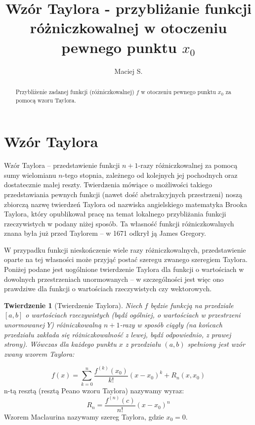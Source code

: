 \documentclass[]{article}
\title{Wzór Taylora - przybliżanie funkcji różniczkowalnej w otoczeniu pewnego punktu $x_0$}
\author{Maciej S.}
\newtheorem{theorem}{Twierdzenie}
\begin{document}
\maketitle

\begin{abstract}
Przybliżenie zadanej funkcji (różniczkowalnej) $f$ w otoczeniu pewnego punktu $x_0$ za pomocą wzoru Taylora.
\end{abstract}

\section{Wzór Taylora}
Wzór Taylora – przedstawienie funkcji $n+1$-razy różniczkowalnej za pomocą sumy wielomianu $n$-tego stopnia, zależnego od kolejnych jej pochodnych oraz dostatecznie małej reszty. Twierdzenia mówiące o możliwości takiego przedstawiania pewnych funkcji (nawet dość abstrakcyjnych przestrzeni) noszą zbiorczą nazwę twierdzeń Taylora od nazwiska angielskiego matematyka Brooka Taylora, który opublikował pracę na temat lokalnego przybliżania funkcji rzeczywistych w podany niżej sposób. Ta własność funkcji różniczkowalnych znana była już przed Taylorem – w 1671 odkrył ją James Gregory.

W przypadku funkcji nieskończenie wiele razy różniczkowalnych, przedstawienie oparte na tej własności może przyjąć postać szeregu zwanego szeregiem Taylora. Poniżej podane jest uogólnione twierdzenie Taylora dla funkcji o wartościach w dowolnych przestrzeniach unormowanych – w szczególności jest więc ono prawdziwe dla funkcji o wartościach rzeczywistych czy wektorowych.

\begin{theorem}[Twierdzenie Taylora]
Niech $f$ będzie funkcją na przedziale $[a, b]$ o wartościach rzeczywistych (bądź ogólniej, o wartościach w przestrzeni unormowanej $Y$) różniczkowalną $n+1$-razy w sposób ciągły (na końcach przedziału zakłada się różniczkowalność z lewej, bądź odpowiednio, z prawej strony). Wówczas dla każdego punktu $x$ z przedziału $(a, b)$ spełniony jest wzór zwany wzorem Taylora:
\end{theorem}

$$f(x) = \sum_{k = 0}^{n}\frac{f^{(k)}(x_0)}{k!}(x-x_0)^k + R_n(x, x_0)$$
n-tą resztą (resztą Peano wzoru Taylora) nazywamy wyraz:
$$R_n = \frac{f^{(n)}(c)}{n!}(x-x_0)^n$$
Wzorem Maclaurina nazywamy szereg Taylora, gdzie $x_0 = 0$.

\begin{figure}[t]
	
\end{figure}
\end{document}
